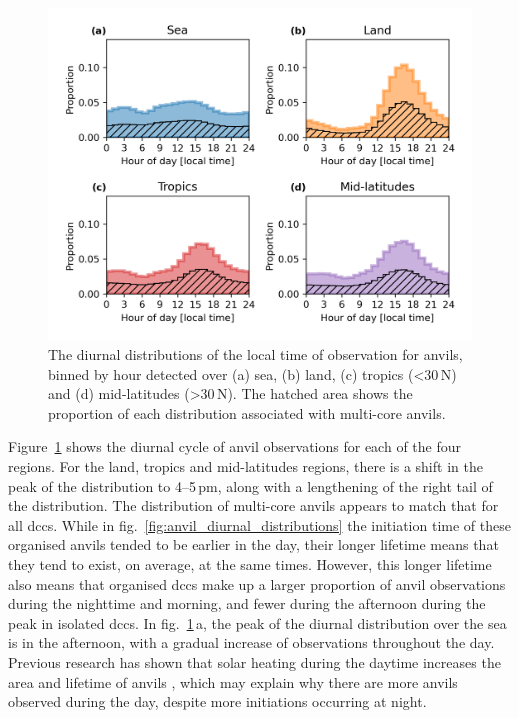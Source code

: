 \begin{figure}[tp]
    \centering
    \includegraphics[width=\textwidth]{figures/chapter2_26.png}
    \caption[
    The diurnal distributions of the local time of observation for anvils detected over sea, land, tropics and mid-latitudes
    ]{
    The diurnal distributions of the local time of observation for anvils, binned by hour detected over (a) sea, (b) land, (c) tropics (\textless 30\,\textdegree N) and (d) mid-latitudes (\textgreater 30\,\textdegree N). The hatched area shows the proportion of each distribution associated with multi-core anvils.
    }
    \label{fig:anvil_diurnal_obs_distributions}
\end{figure}

Figure~\ref{fig:anvil_diurnal_obs_distributions} shows the diurnal cycle of anvil observations for each of the four regions.
For the land, tropics and mid-latitudes regions, there is a shift in the peak of the distribution to 4--5\,pm, along with a lengthening of the right tail of the distribution.
The distribution of multi-core anvils appears to match that for all \acrshort{dcc}s.
While in fig.~\ref{fig:anvil_diurnal_distributions} the initiation time of these organised anvils tended to be earlier in the day, their longer lifetime means that they tend to exist, on average, at the same times.
However, this longer lifetime also means that organised \acrshort{dcc}s make up a larger proportion of anvil observations during the nighttime and morning, and fewer during the afternoon during the peak in isolated \acrshort{dcc}s.
In fig.~\ref{fig:anvil_diurnal_obs_distributions}\,a, the peak of the diurnal distribution over the sea is in the afternoon, with a gradual increase of observations throughout the day.
Previous research has shown that solar heating during the daytime increases the area and lifetime of anvils \citep{gasparini_diurnal_2022}, which may explain why there are more anvils observed during the day, despite more initiations occurring at night.

